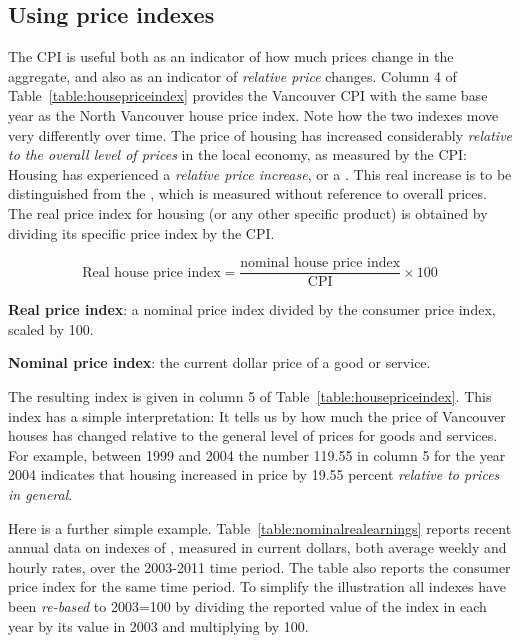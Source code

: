 \subsection*{Using price indexes}

The CPI is useful both as an indicator of how much prices change in the aggregate, and also as an indicator of \textit{relative price} changes. Column 4 of Table~\ref{table:housepriceindex} provides the Vancouver CPI with the same base year as the North Vancouver house price index. Note how the two indexes move very differently over time. The price of housing has increased considerably \textit{relative to the overall level of prices} in the local economy, as measured by the CPI: Housing has experienced a \textit{relative price increase}, or a . This real increase is to be distinguished from the , which is measured without reference to overall prices. The real price index for housing (or any other specific product) is obtained by dividing its specific price index by the CPI.

\begin{equation*}
\text{Real house price index}=\frac{\text{nominal house price index}}{\text{CPI}}\times 100
\end{equation*}

\begin{DefBox}
\textbf{Real price index}: a nominal price index divided by the consumer price index, scaled by 100.

\textbf{Nominal price index}: the current dollar price of a good or service.
\end{DefBox}

The resulting index is given in column 5 of Table~\ref{table:housepriceindex}. This index has a simple interpretation: It tells us by how much the price of Vancouver houses has changed relative to the general level of prices for goods and services. For example, between 1999 and 2004 the number 119.55 in column 5 for the year 2004 indicates that housing increased in price by 19.55 percent \textit{relative to prices in general}.

Here is a further simple example. Table~\ref{table:nominalrealearnings} reports recent annual data on indexes of , measured in current dollars, both average weekly and hourly rates, over the 2003-2011 time period. The table also reports the consumer price index for the same time period. To simplify the illustration all indexes have been \textit{re-based} to 2003=100 by dividing the reported value of the index in each year by its value in 2003 and multiplying by 100.

